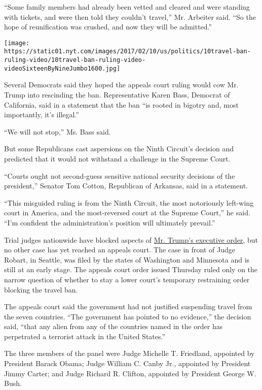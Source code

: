 ``Some family members had already been vetted and cleared and were
standing with tickets, and were then told they couldn't travel,'' Mr.
Arbeiter said. ``So the hope of reunification was crushed, and now they
will be admitted.''

\texttt{[image: https://static01.nyt.com/images/2017/02/10/us/politics/10travel-ban-ruling-video/10travel-ban-ruling-video-videoSixteenByNineJumbo1600.jpg]}

Several Democrats said they hoped the appeals court ruling would cow Mr.
Trump into rescinding the ban. Representative Karen Bass, Democrat of
California, said in a statement that the ban ``is rooted in bigotry and,
most importantly, it's illegal.''

``We will not stop,'' Ms. Bass said.

But some Republicans cast aspersions on the Ninth Circuit's decision and
predicted that it would not withstand a challenge in the Supreme Court.

``Courts ought not second-guess sensitive national security decisions of
the president,'' Senator Tom Cotton, Republican of Arkansas, said in a
statement.

``This misguided ruling is from the Ninth Circuit, the most notoriously
left-wing court in America, and the most-reversed court at the Supreme
Court,'' he said. ``I'm confident the administration's position will
ultimately prevail.''

Trial judges nationwide have blocked aspects of
\href{https://www.nytimes.com/2017/01/27/us/politics/refugee-muslim-executive-order-trump.html}{Mr.
Trump's executive order}, but no other case has yet reached an appeals
court. The case in front of Judge Robart, in Seattle, was filed by the
states of Washington and Minnesota and is still at an early stage. The
appeals court order issued Thursday ruled only on the narrow question of
whether to stay a lower court's temporary restraining order blocking the
travel ban.

The appeals court said the government had not justified suspending
travel from the seven countries. ``The government has pointed to no
evidence,'' the decision said, ``that any alien from any of the
countries named in the order has perpetrated a terrorist attack in the
United States.''

The three members of the panel were Judge Michelle T. Friedland,
appointed by President Barack Obama; Judge William C. Canby Jr.,
appointed by President Jimmy Carter; and Judge Richard R. Clifton,
appointed by President George W. Bush.

